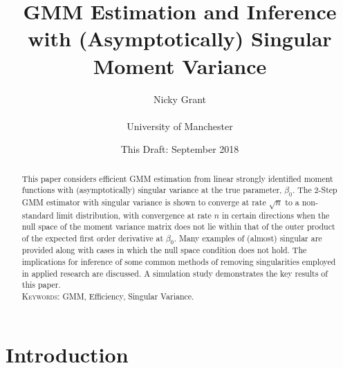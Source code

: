\documentclass[11pt, fleqn]{article}
\begin{document}
\setlength{\parindent}{0pt}


\title{   GMM Estimation and Inference with (Asymptotically) Singular Moment Variance}\setlength{\parindent}{0pt}


\author{Nicky Grant  \\\\
 University of Manchester \\}

\date{This Draft: September 2018}
\maketitle\setlength{\parindent}{0pt}



\begin{abstract}
 \small\setlength{\parindent}{0pt}

This paper considers efficient GMM estimation  from linear strongly identified moment functions with  (asymptotically) singular variance  at the true parameter, $\beta_0$.  The 2-Step GMM estimator with singular variance is shown to converge at rate $\sqrt{n}$ to a non-standard limit distribution, with convergence at rate $n$ in  certain directions when the null space of the moment variance matrix does not lie within that of the outer product of the expected  first order derivative at $\beta_0$. Many examples of (almost) singular  are provided along with  cases in which the null space condition does not hold.  The implications for inference of some common methods of removing singularities  employed in applied research are discussed. A simulation study demonstrates the key results of this paper.\\



\textsc{Keywords:} GMM, Efficiency, Singular Variance.







\end{abstract}


\newpage

\section{Introduction}
\end{document}

